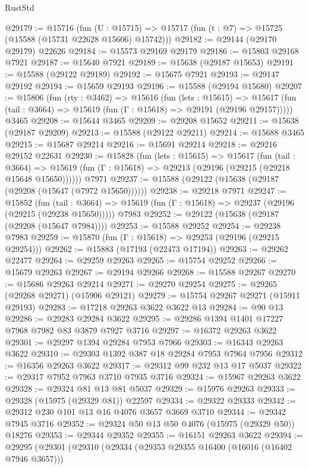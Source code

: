 \begin{lexlean}{RustStd}
\begin{coremodule}
@29179 := @15716
    (fun (U : @15715) => @15717 (fun (t : @7) => @15725 (@15588 (@15731 @22628 @15606) @15742)))
@29182 := @29144 (@29170 @29179) @22626
@29184 := @15573 @29169 @29179
@29186 := @15803 @29168 @7921
@29187 := @15640 @7921
@29189 := @15638 (@29187 @15653)
@29191 := @15588 (@29122 @29189)
@29192 := @15675 @7921
@29193 := @29147 @29192
@29194 := @15659 @29193
@29196 := @15588 (@29194 @15680)
@29207 := @15806
    (fun (rty : @3462) =>
    @15616
      (fun (lets : @15615) =>
      @15617 (fun (tail : @3664) => @15619 (fun (Γ : @15618) => @29191 (@29196 @29157)))))
    @3465
@29208 := @15644 @3465
@29209 := @29208 @15652
@29211 := @15638 (@29187 @29209)
@29213 := @15588 (@29122 @29211)
@29214 := @15688 @3465
@29215 := @15687 @29214
@29216 := @15691 @29214
@29218 := @29216 @29152 @22631
@29230 := @15828
    (fun (lets : @15615) =>
    @15617
      (fun (tail : @3664) =>
      @15619 (fun (Γ : @15618) => @29213 (@29196 (@29215 (@29218 @15648 @15650))))))
    @7971
@29237 := @15588 (@29122 (@15638 (@29187 (@29208 (@15647 (@7972 @15650))))))
@29238 := @29218 @7971
@29247 := @15852
    (fun (tail : @3664) => @15619 (fun (Γ : @15618) => @29237 (@29196 (@29215 (@29238 @15650)))))
    @7983
@29252 := @29122 (@15638 (@29187 (@29208 (@15647 @7984))))
@29253 := @15588 @29252
@29254 := @29238 @7983
@29259 := @15870 (fun (Γ : @15618) => @29253 (@29196 (@29215 @29254)))
@29262 := @15883 (@17193 (@22473 @17194))
@29263 := @29262 @22477
@29264 := @29259 @29263
@29265 := @15754 @29252
@29266 := @15679 @29263
@29267 := @29194 @29266
@29268 := @15588 @29267
@29270 := @15686 @29263 @29214
@29271 := @29270 @29254
@29275 := @29265 (@29268 @29271) (@15906 @29121)
@29279 := @15754 @29267 @29271 (@15911 @29193)
@29283 := @17218 @29263 @3622 @3622 @13
@29284 := @90 @13
@29286 := @29283 @29284 @3622
@29295 := @29286 @1394 @1401 @17227 @7968 @7982 @83 @3879 @7927 @3716
@29297 := @16372 @29263 @3622
@29301 := @29297 @1394 @29284 @7953 @7966
@29303 := @16343 @29263 @3622
@29310 := @29303 @1392 @387 @18 @29284 @7953 @7964 @7956
@29312 := @16356 @29263 @3622
@29317 := @29312 @99 @232 @13 @17 @5037
@29322 := @29317 @7952 @7963 @3710 @7935 @3716
@29324 := @15967 @29263 @3622
@29328 := @29324 @81 @13 @81 @5037
@29329 := @15976 @29263
@29333 := @29328 (@15975 (@29329 @81)) @22597
@29334 := @29322 @29333
@29342 := @29312 @230 @101 @13 @16 @4076 @3657 @3669 @3710
@29344 := @29342 @7945 @3716
@29352 := @29324 @50 @13 @50 @4076 (@15975 (@29329 @50)) @18276
@29353 := @29344 @29352
@29355 := @16151 @29263 @3622
@29394 := @29295
    (@29301
      (@29310
        (@29334
          (@29353 @29355 @16400 (@16016 (@16402 @7946 @3657)))

\end{coremodule}
\end{lexlean}
